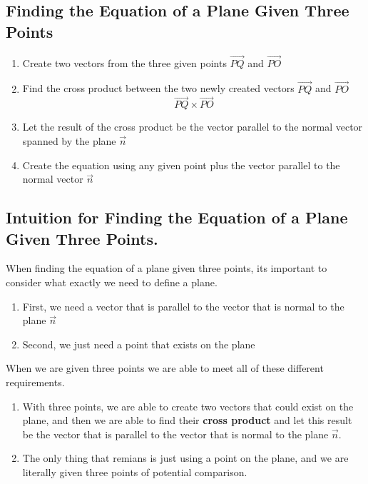 \documentclass{report}
\begin{document}
\begin{sloppypar}
\begin{enumerate}
\begin{enumerate}
        \end{enumerate}


\end{enumerate}

\subsection{Finding the Equation of a Plane Given
  Three Points}
\begin{center}
      {\begin{enumerate}
        \item Create two vectors from the three given points $ \overrightarrow{PQ}$ and $ \overrightarrow{PO}$

      \item Find the cross product between the two
      newly created vectors $ \overrightarrow{PQ}$ and
      $ \overrightarrow{PO}$
      \[ \overrightarrow{PQ} \times \overrightarrow{PO} \]
      \item Let the result of the cross product
      be the vector parallel to the normal vector
      spanned by the plane $ \vec{n} $
      \item Create the equation using any given point
      plus the vector parallel to the normal vector $
      \vec{n}$
      \end{enumerate}
       }
\end{center}
\subsection{Intuition for Finding the Equation of a Plane
Given Three Points.}
        When finding the equation of a plane
        given three points, its important to consider
        what exactly we need to define a plane.
        \begin{enumerate}
          \item First, we need a vector that
                is parallel to the vector that
                is normal to the plane $ \vec{n}$
          \item Second, we just need a point
                that exists on the plane
        \end{enumerate}
        When we are given three points we are able to
        meet all of these different requirements.
        \begin{enumerate}
          \item With three points, we are able to
                create two vectors that could exist
                on the plane, and then we are able
                to find their \textbf{cross product} and
                let this result be the vector that
                is parallel to the vector that is
                normal to the plane $ \vec{n}$.
          \item The only thing that remians is just
                using a point on the plane, and
                we are literally given three points of
                potential comparison.
        \end{enumerate}



\end{sloppypar}
\end{document}
